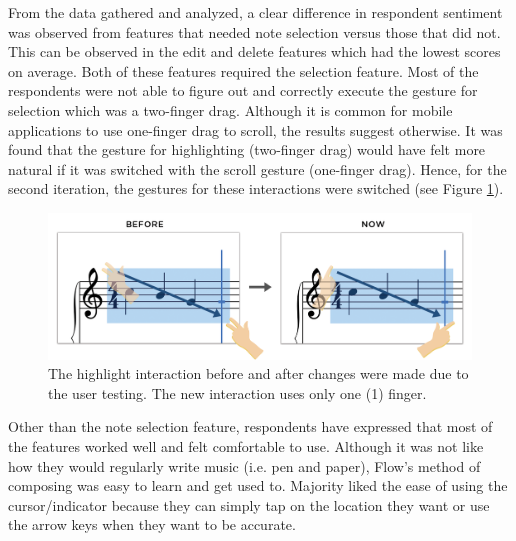 			From the data gathered and analyzed, a clear difference in respondent sentiment was observed from features that needed note selection versus those that did not. This can be observed in the edit and delete features which had the lowest scores on average. Both of these features required the selection feature. Most of the respondents were not able to figure out and correctly execute the gesture for selection which was a two-finger drag. Although it is common for mobile applications to use one-finger drag to scroll, the results suggest otherwise. It was found that the gesture for highlighting (two-finger drag) would have felt more natural if it was switched with the scroll gesture (one-finger drag). Hence, for the second iteration, the gestures for these interactions were switched (see Figure \ref{fig:highlight}).

			\begin{figure}[h]
				\centering
				\includegraphics[scale=0.25]{figures/before-after-highlight}
			    \caption{The highlight interaction before and after changes were made due to the user testing. The new interaction uses only one (1) finger.}
			    \label{fig:highlight}
			\end{figure}

			Other than the note selection feature, respondents have expressed that most of the features worked well and felt comfortable to use. Although it was not like how they would regularly write music (i.e. pen and paper), Flow's method of composing was easy to learn and get used to. Majority liked the ease of using the cursor/indicator because they can simply tap on the location they want or use the arrow keys when they want to be accurate.

